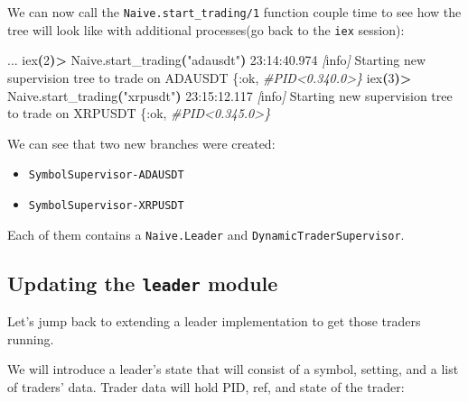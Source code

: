 \documentclass[
  oneside]{book}
\newenvironment{Shaded}{\begin{snugshade}}{\end{snugshade}}
\newcommand{\CommentTok}[1]{\textcolor[rgb]{0.56,0.35,0.01}{\textit{#1}}}
\newcommand{\ErrorTok}[1]{\textcolor[rgb]{0.64,0.00,0.00}{\textbf{#1}}}
\newcommand{\ExtensionTok}[1]{#1}
\newcommand{\KeywordTok}[1]{\textcolor[rgb]{0.13,0.29,0.53}{\textbf{#1}}}
\newcommand{\NormalTok}[1]{#1}
\newcommand{\OperatorTok}[1]{\textcolor[rgb]{0.81,0.36,0.00}{\textbf{#1}}}
\newcommand{\PreprocessorTok}[1]{\textcolor[rgb]{0.56,0.35,0.01}{\textit{#1}}}
\newcommand{\SpecialStringTok}[1]{\textcolor[rgb]{0.31,0.60,0.02}{#1}}
\newcommand{\StringTok}[1]{\textcolor[rgb]{0.31,0.60,0.02}{#1}}
\providecommand{\tightlist}{%
  \setlength{\itemsep}{0pt}\setlength{\parskip}{0pt}}
\begin{document}
We can now call the \texttt{Naive.start\_trading/1} function couple time to see how the tree will look like with additional processes(go back to the \texttt{iex} session):

\begin{Shaded}
\begin{Highlighting}[]
\ExtensionTok{...}
\ExtensionTok{iex}\ErrorTok{(}\ExtensionTok{2}\KeywordTok{)}\OperatorTok{\textgreater{}}\NormalTok{ Naive.start\_trading}\KeywordTok{(}\StringTok{"adausdt"}\KeywordTok{)}
\ExtensionTok{23:14:40.974} \PreprocessorTok{[}\SpecialStringTok{info}\PreprocessorTok{]}\NormalTok{  Starting new supervision tree to trade on ADAUSDT}
\ExtensionTok{\{:ok,} \CommentTok{\#PID\textless{}0.340.0\textgreater{}\}}
\ExtensionTok{iex}\ErrorTok{(}\ExtensionTok{3}\KeywordTok{)}\OperatorTok{\textgreater{}}\NormalTok{ Naive.start\_trading}\KeywordTok{(}\StringTok{"xrpusdt"}\KeywordTok{)}
\ExtensionTok{23:15:12.117} \PreprocessorTok{[}\SpecialStringTok{info}\PreprocessorTok{]}\NormalTok{  Starting new supervision tree to trade on XRPUSDT}
\ExtensionTok{\{:ok,} \CommentTok{\#PID\textless{}0.345.0\textgreater{}\}}
\end{Highlighting}
\end{Shaded}

We can see that two new branches were created:

\begin{itemize}
\tightlist
\item
  \texttt{SymbolSupervisor-ADAUSDT}
\item
  \texttt{SymbolSupervisor-XRPUSDT}
\end{itemize}

Each of them contains a \texttt{Naive.Leader} and \texttt{DynamicTraderSupervisor}.

\subsection{\texorpdfstring{Updating the \texttt{leader} module}{Updating the leader module}}\label{updating-the-leader-module}

Let's jump back to extending a leader implementation to get those traders running.

We will introduce a leader's state that will consist of a symbol, setting, and a list of traders' data. Trader data will hold PID, ref, and state of the trader:
\end{document}
